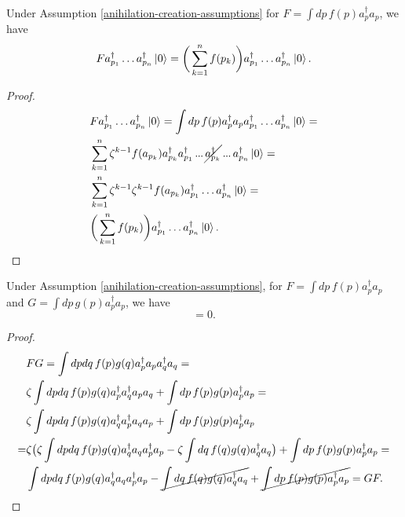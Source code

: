 \documentclass[main.tex]{subfiles}
\begin{document}
\begin{proposition}
Under Assumption \ref{anihilation-creation-assumptions} for $F = \int dp\, f(p)a^\dagger_p a_p$, we have
\begin{equation}
F a^\dagger_{p_1} \dots a^\dagger_{p_n}\ket{0} = \bigg( \sum_{k = 1}^n f(p_k)\bigg) a^\dagger_{p_1}  \dots a^\dagger_{p_n}\ket{0}.
\end{equation}
\end{proposition}
\begin{proof}
\begin{align*}
& F a^\dagger_{p_1} \dots a^\dagger_{p_n}\ket{0} = \int dp\, f(p)a^\dagger_p a_p a^\dagger_{p_1}  \dots a^\dagger_{p_n}\ket{0} = \\
& \sum_{k=1}^n\zeta^{k-1} f(a_{p_k}) a^\dagger_{p_k}
a^\dagger_{p_1} \tdots \cancel{a^\dagger_{p_k}} \tdots a^\dagger_{p_n}\ket{0} = \\
& \sum_{k=1}^n\zeta^{k-1} \zeta^{k-1} f(a_{p_k}) a^\dagger_{p_1}  \dots a^\dagger_{p_n}\ket{0} = \\
& \bigg( \sum_{k = 1}^n f(p_k)\bigg) a^\dagger_{p_1}  \dots a^\dagger_{p_n}\ket{0}.
\end{align*}
\end{proof}

\begin{proposition} Under Assumption \ref{anihilation-creation-assumptions}, for
$F = \int dp\, f(p)a^\dagger_p a_p$ and $G = \int dp\, g(p)a^\dagger_p a_p$, we have
\begin{equation}
[F, G] = 0.
\end{equation} 
\end{proposition}
\begin{proof}
\begin{align*}
&FG = \int dp dq \,f(p)g(q) a^\dagger_p a_p a^\dagger_q a_q = \\
& \zeta \int dp dq \, f(p)g(q) a^\dagger_p  a^\dagger_q a_p a_q + \int dp\, f(p)g(p) a^\dagger_p a_p =  \\
& \zeta \int dp dq\, f(p)g(q) a^\dagger_q a^\dagger_p  a_q  a_p  + \int dp\, f(p)g(p) a^\dagger_p a_p \\ =
& \zeta \big( \zeta \int dp dq\, f(p)g(q) a^\dagger_q a_q a^\dagger_p   a_p - \zeta \int dq\, f(q)g(q) a^\dagger_q    a_q \big)  + \int dp\, f(p)g(p) a^\dagger_p a_p = \\
& \int dp dq\, f(p)g(q) a^\dagger_q a_q a^\dagger_p   a_p - \cancel{\int dq \, f(q)g(q) a^\dagger_q    a_q}  + \cancel{\int dp\, f(p)g(p) a^\dagger_p a_p} 
= GF. \\ 
\end{align*}
\end{proof}
\end{document}
